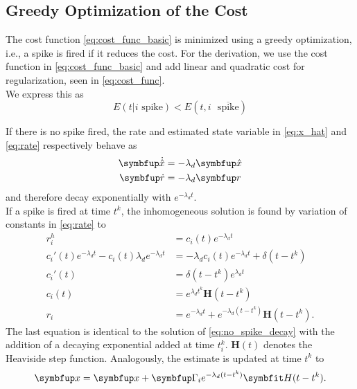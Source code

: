 \subsection{Greedy Optimization of the Cost}
The cost function \cref{eq:cost_func_basic} is minimized using a greedy optimization, i.e., a spike is fired if it reduces the cost. For the derivation, we use the cost function in \cref{eq:cost_func_basic} and add linear and quadratic cost for regularization, seen in \cref{eq:cost_func}.\\
We express this as
\begin{equation}\label{eq:spike_condition}
	E(t|i \text{ spike}) < E(t,i \text{ }\overline{\text{spike}})
\end{equation}

If there is no spike fired, the rate and estimated state variable in \cref{eq:x_hat} and \cref{eq:rate} respectively behave as
\begin{equation}\label{eq:no_spike_decay}
\begin{aligned}
\bmu{\dot{\hat{x}}} &= -\lambda_d \bmu{\hat{x}}\\
\bmu{\dot{r}} &= -\lambda_d\bmu{r}
\end{aligned}
\end{equation}
and therefore decay exponentially with $e^{-\lambda_d t}$.\\
If a spike is fired at time $t^k$, the inhomogeneous solution is found by variation of constants in \cref{eq:rate} to
\begin{equation}\label{eq:rate_inhomo}
\begin{aligned}
r_i^h &= c_i(t)e^{-\lambda_d t}\\
c_i'(t) e^{-\lambda_d t} - c_i(t)\lambda_d e^{-\lambda_d t}&= -\lambda_d c_i(t)e^{-\lambda_d t} + \delta(t- t^k)\\
c_i'(t) &= \delta(t- t^k) e^{\lambda_d t}\\
c_i(t) &=  e^{\lambda_d t^k} \bm{H}(t-t^k)\\
r_i &=e^{-\lambda_d t} + e^{-\lambda_d (t-t^k)} \bm{H}(t-t^k).
\end{aligned}
\end{equation}
The last equation is identical to the solution of \cref{eq:no_spike_decay} with the addition of a decaying exponential added at time $t_i^k$. $\bm{H}(t)$ denotes the Heaviside step function. Analogously, the estimate is updated at time $t^k$ to
\begin{equation}\label{eq:update_x_spike}
	\bmu{x} =  \bmu{x} + \bmu{\Gamma}_ie^{-\lambda_d (t-t^k)} \bm{H}(t-t^k).
\end{equation}
